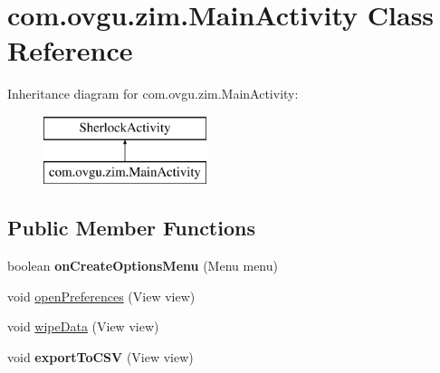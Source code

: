 \hypertarget{classcom_1_1ovgu_1_1zim_1_1_main_activity}{\section{com.\-ovgu.\-zim.\-Main\-Activity Class Reference}
\label{classcom_1_1ovgu_1_1zim_1_1_main_activity}
}
Inheritance diagram for com.\-ovgu.\-zim.\-Main\-Activity\-:\begin{figure}[H]
\begin{center}
\leavevmode
\includegraphics[height=2.000000cm]{classcom_1_1ovgu_1_1zim_1_1_main_activity}
\end{center}
\end{figure}
\subsection*{Public Member Functions}
\begin{DoxyCompactItemize}
\item 
\hypertarget{classcom_1_1ovgu_1_1zim_1_1_main_activity_ac798f4f737491eeb662eadbb28997e8e}{boolean {\bfseries on\-Create\-Options\-Menu} (Menu menu)}\label{classcom_1_1ovgu_1_1zim_1_1_main_activity_ac798f4f737491eeb662eadbb28997e8e}

\item 
void \hyperlink{classcom_1_1ovgu_1_1zim_1_1_main_activity_aabd114a80ae210faa283375f2e6bc7de}{open\-Preferences} (View view)
\item 
void \hyperlink{classcom_1_1ovgu_1_1zim_1_1_main_activity_afc4cfd60a7a114671805f0179db2eb34}{wipe\-Data} (View view)
\item 
\hypertarget{classcom_1_1ovgu_1_1zim_1_1_main_activity_ad547d8a3800ae159dffdc697ef2474da}{void {\bfseries export\-To\-C\-S\-V} (View view)}\label{classcom_1_1ovgu_1_1zim_1_1_main_activity_ad547d8a3800ae159dffdc697ef2474da}

\end{DoxyCompactItemize}
